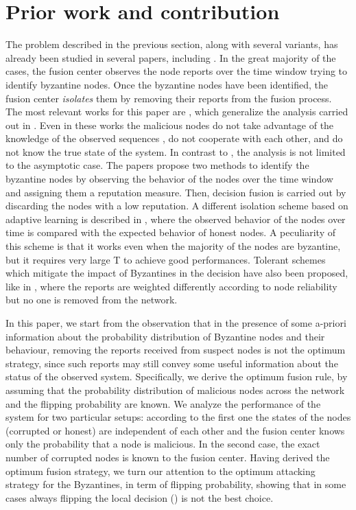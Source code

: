 \documentclass[10pt,peerreview,draftcls,onecolumn]{IEEEtran}
\begin{document}
\section{Prior work and contribution}

The problem described in the previous section, along with several variants, has already been studied in several papers, including \cite{Mar09, Raw11,CDC, Bar13}. In the great majority of the cases, the fusion center observes the node reports over the time window  trying to identify byzantine nodes. Once the byzantine nodes have been identified, the fusion center {\em isolates} them by removing their reports from the fusion process.
The most relevant works for this paper are \cite{Raw11,CDC}, which generalize the analysis carried out in \cite{Mar09}. Even in these works the malicious nodes do not take advantage of the knowledge of the observed sequences , do not cooperate with each other, and do not know the true state of the system. In contrast to \cite{Mar09}, the analysis is not limited to the asymptotic case. The papers propose two methods to identify the byzantine nodes by observing the behavior of the nodes over the time window  and assigning them a reputation measure. Then, decision fusion is carried out by discarding the nodes with a low reputation.  A different isolation scheme based on adaptive learning is described in \cite{LearnByzantines}, where the observed behavior of the nodes over time is compared with the expected behavior of honest nodes. A peculiarity of this scheme is that it works even when the majority of the nodes are byzantine, but it requires very large T to achieve good performances. Tolerant schemes which mitigate the impact of Byzantines in the decision have also been proposed, like in \cite{tolerant_scheme}, where the reports are weighted differently according to node reliability but no one is removed from the network.

In this paper, we start from the observation that in the presence of some a-priori information about the probability distribution of Byzantine nodes and their behaviour, removing the reports received from suspect nodes is not the optimum strategy, since such reports may still convey some useful information about the status of the observed system. Specifically, we derive the optimum fusion rule, by assuming that the probability distribution of malicious nodes across the network and the flipping probability  are known. We analyze the performance of the system for two particular setups: according to the first one the states of the nodes (corrupted or honest) are independent of each other and the fusion center knows only the probability that a node is malicious. In the second case, the exact number of corrupted nodes is known to the fusion center.  Having derived the optimum fusion strategy, we turn our attention to the optimum attacking strategy for the Byzantines, in term of flipping probability, showing that in some cases always flipping the local decision () is not the best choice.
\end{document}
